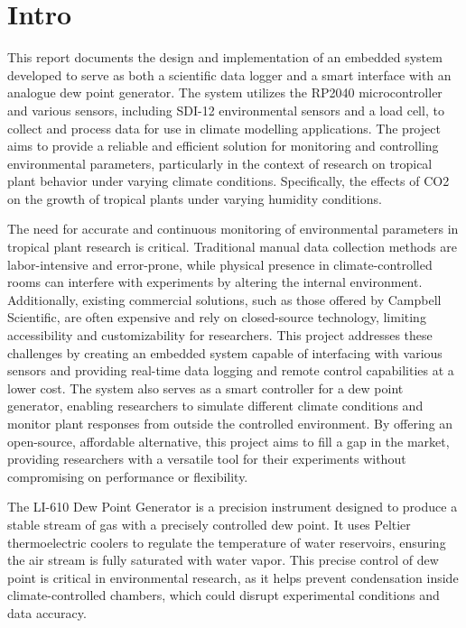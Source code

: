 \section{Intro}

This report documents the design and implementation of an embedded system developed to serve as both a scientific data logger and a smart interface with an analogue dew point generator. The system utilizes the RP2040 microcontroller and various sensors, including SDI-12 environmental sensors and a load cell, to collect and process data for use in climate modelling applications. The project aims to provide a reliable and efficient solution for monitoring and controlling environmental parameters, particularly in the context of research on tropical plant behavior under varying climate conditions. Specifically, the effects of CO2 on the growth of tropical plants under varying humidity conditions. 

The need for accurate and continuous monitoring of environmental parameters in tropical plant research is critical. Traditional manual data collection methods are labor-intensive and error-prone, while physical presence in climate-controlled rooms can interfere with experiments by altering the internal environment. Additionally, existing commercial solutions, such as those offered by Campbell Scientific, are often expensive and rely on closed-source technology, limiting accessibility and customizability for researchers. This project addresses these challenges by creating an embedded system capable of interfacing with various sensors and providing real-time data logging and remote control capabilities at a lower cost. The system also serves as a smart controller for a dew point generator, enabling researchers to simulate different climate conditions and monitor plant responses from outside the controlled environment. By offering an open-source, affordable alternative, this project aims to fill a gap in the market, providing researchers with a versatile tool for their experiments without compromising on performance or flexibility.



The LI-610 Dew Point Generator is a precision instrument designed to produce a stable stream of gas with a precisely controlled dew point. It uses Peltier thermoelectric coolers to regulate the temperature of water reservoirs, ensuring the air stream is fully saturated with water vapor. This precise control of dew point is critical in environmental research, as it helps prevent condensation inside climate-controlled chambers, which could disrupt experimental conditions and data accuracy.